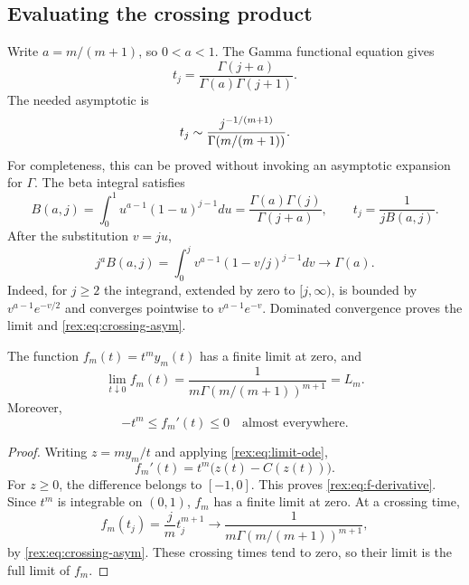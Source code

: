 \subsection{Evaluating the crossing product}

Write $a=m/(m+1)$, so $0<a<1$. The Gamma functional equation gives
\begin{equation}\label{rex:eq:gamma-product}
 t_j=\frac{\Gamma(j+a)}{\Gamma(a)\Gamma(j+1)}.
\end{equation}
The needed asymptotic is
\begin{equation}\label{rex:eq:crossing-asym}
 t_j\mathrel{\sim}\frac{j^{-1/(m+1)}}{\Gamma(m/(m+1))}.
\end{equation}
For completeness, this can be proved without invoking an asymptotic
expansion for $\Gamma$. The beta integral satisfies
\[
 B(a,j)=\int_0^1u^{a-1}(1-u)^{j-1}du
       =\frac{\Gamma(a)\Gamma(j)}{\Gamma(j+a)},
 \qquad t_j=\frac1{jB(a,j)}.
\]
After the substitution $v=ju$,
\[
 j^aB(a,j)=\int_0^j v^{a-1}(1-v/j)^{j-1}dv\longrightarrow\Gamma(a).
\]
Indeed, for $j\geq2$ the integrand, extended by zero to $[j,\infty)$,
is bounded by $v^{a-1}e^{-v/2}$ and converges pointwise to
$v^{a-1}e^{-v}$. Dominated convergence proves the limit and
\cref{rex:eq:crossing-asym}.

\begin{lemma}\label{rex:lem:weighted-limit}
The function $f_m(t)=t^m y_m(t)$ has a finite limit at zero, and
\begin{equation}\label{rex:eq:weighted-limit}
 \lim_{t\downarrow0}f_m(t)
 =\frac1{m\Gamma(m/(m+1))^{m+1}}=L_m.
\end{equation}
Moreover,
\begin{equation}\label{rex:eq:f-derivative}
 -t^m\leq f_m'(t)\leq0\quad\text{almost everywhere}.
\end{equation}
\end{lemma}

\begin{proof}
Writing $z=my_m/t$ and applying \cref{rex:eq:limit-ode},
\[
 f_m'(t)=t^m\bigl(z(t)-C(z(t))\bigr).
\]
For $z\geq0$, the difference belongs to $[-1,0]$. This proves
\cref{rex:eq:f-derivative}. Since $t^m$ is integrable on $(0,1)$,
$f_m$ has a finite limit at zero. At a crossing time,
\[
 f_m(t_j)=\frac jm t_j^{m+1}
 \longrightarrow\frac1{m\Gamma(m/(m+1))^{m+1}},
\]
by \cref{rex:eq:crossing-asym}. These crossing times tend to zero, so their
limit is the full limit of $f_m$.
\end{proof}

